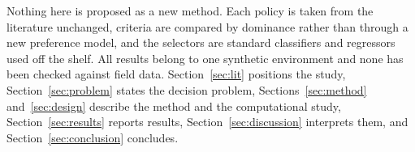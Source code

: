 \documentclass[preprint,12pt]{elsarticle}
\begin{document}
Nothing here is proposed as a new method. Each policy is taken from the
literature unchanged, criteria are compared by dominance rather than through a
new preference model, and the selectors are standard classifiers and regressors
used off the shelf. All results belong to one synthetic environment and none has
been checked against field data.
Section~\ref{sec:lit} positions the study, Section~\ref{sec:problem} states the
decision problem, Sections~\ref{sec:method} and~\ref{sec:design} describe the
method and the computational study, Section~\ref{sec:results} reports results,
Section~\ref{sec:discussion} interprets them, and
Section~\ref{sec:conclusion} concludes.
\end{document}

